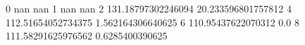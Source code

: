 0 nan nan
1 nan nan
2 131.18797302246094 20.233596801757812
4 112.51654052734375 1.562164306640625
6 110.95437622070312 0.0
8 111.58291625976562 0.6285400390625

